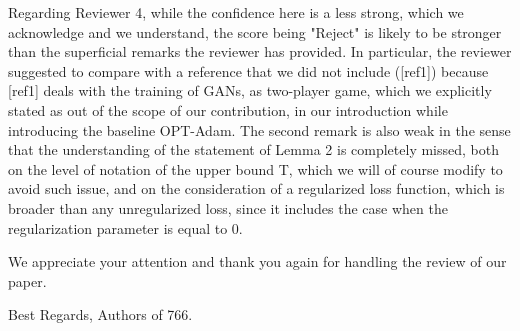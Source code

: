 \documentclass{article}
\begin{document}
Regarding Reviewer 4, while the confidence here is a less strong, which we acknowledge and we understand, the score being "Reject" is likely to be stronger than the superficial remarks the reviewer has provided. In particular, the reviewer suggested to compare with a reference that we did not include ([ref1]) because [ref1] deals with the training of GANs, as two-player game, which we explicitly stated as out of the scope of our contribution, in our introduction while introducing the baseline OPT-Adam. The second remark is also weak in the sense that the understanding of the statement of Lemma 2 is completely missed, both on the level of notation of the upper bound T, which we will of course modify to avoid such issue, and on the consideration of a regularized loss function, which is broader than any unregularized loss, since it includes the case when the regularization parameter is equal to 0.


We appreciate your attention and thank you again for handling the review of our paper. 

Best Regards,
Authors of 766.
\end{document}
